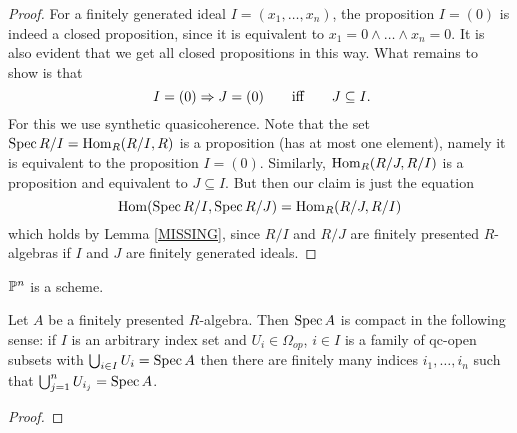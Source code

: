 \documentclass{zariski}
\begin{document}
\begin{proof}
  For a finitely generated ideal $I = (x_1, \dots, x_n)$,
  the proposition $I = (0)$ is indeed a closed proposition,
  since it is equivalent to $x_1 = 0 \land \dots \land x_n = 0$.
  It is also evident that we get all closed propositions in this way.
  What remains to show is that
  \[ I = (0) \Rightarrow J = (0)
     \qquad\text{iff}\qquad
     J \subseteq I
     \rlap{\text{.}}
  \]
  For this we use synthetic quasicoherence.
  Note that the set $\operatorname{Spec} R/I = \mathrm{Hom}_R(R/I, R)$ is a proposition
  (has at most one element),
  namely it is equivalent to the proposition $I = (0)$.
  Similarly, $\mathrm{Hom}_R(R/J, R/I)$ is a proposition
  and equivalent to $J \subseteq I$.
  But then our claim is just the equation
  \[ \mathrm{Hom}(\operatorname{Spec} R/I, \operatorname{Spec} R/J) = \mathrm{Hom}_R(R/J, R/I) \]
  which holds by Lemma \ref{MISSING},
  since $R/I$ and $R/J$ are finitely presented $R$-algebras
  if $I$ and $J$ are finitely generated ideals.
\end{proof}

\begin{theorem}
  $\mathbb{P}^n$ is a scheme.
\end{theorem}


\begin{theorem}
  Let $A$ be a finitely presented $R$-algebra.
  Then $\operatorname{Spec} A$ is compact in the following sense:
  if $I$ is an arbitrary index set and
  $U_i \in \Omega_{op}$, $i \in I$ is a family of qc-open subsets
  with $\bigcup_{i \in I} U_i = \operatorname{Spec} A$
  then there are finitely many indices $i_1, \dots, i_n$
  such that $\bigcup_{j = 1}^{n} U_{i_j} = \operatorname{Spec} A$.
\end{theorem}

\begin{proof}
\end{proof}

\end{document}

